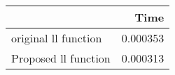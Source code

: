 \begin{tabular}{lr}
\toprule
{} &      Time \\
\midrule
original ll function &  0.000353 \\
Proposed ll function &  0.000313 \\
\bottomrule
\end{tabular}
